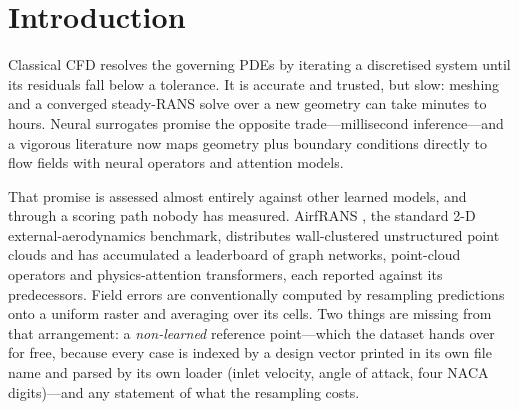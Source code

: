 %
%
%
\section{Introduction}

Classical CFD resolves the governing PDEs by iterating a discretised system until its
residuals fall below a tolerance. It is accurate and trusted, but slow: meshing and a
converged steady-RANS solve over a new geometry can take minutes to hours. Neural
surrogates promise the opposite trade---millisecond inference---and a vigorous
literature now maps geometry plus boundary conditions directly to flow fields with
neural operators and attention models.

That promise is assessed almost entirely against other learned models, and through a
scoring path nobody has measured. AirfRANS \citep{bonnet2022airfrans}, the standard 2-D
external-aerodynamics benchmark, distributes wall-clustered unstructured point clouds and
has accumulated a leaderboard of graph networks, point-cloud operators and
physics-attention transformers, each reported against its predecessors. Field errors are
conventionally computed by resampling predictions onto a uniform raster and averaging over
its cells. Two things are missing from that arrangement: a \emph{non-learned} reference
point---which the dataset hands over for free, because every case is indexed by a design
vector printed in its own file name and parsed by its own loader (inlet velocity, angle of
attack, four NACA digits)---and any statement of what the resampling costs.

